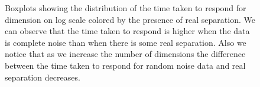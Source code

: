 \documentclass[12]{article}
\begin{document}
\begin{figure}[hbtp]
   \centering
      \caption{Boxplots showing the distribution of the time taken to respond for dimension on log scale colored by the presence of real separation. We can observe that the time taken to respond is higher when the data is complete noise than when there is some real separation. Also we notice that as we increase the number of dimensions the difference between the time taken to respond for random noise data and real separation decreases. }
       \label{time-taken}
\end{figure}

\end{document}

